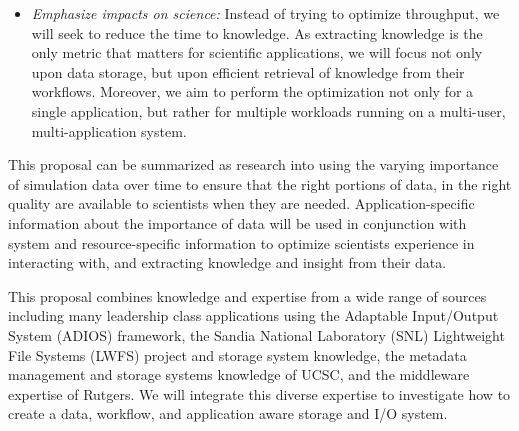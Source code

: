 \begin{itemize}
\item
{\em Emphasize impacts on science:}
Instead of trying to optimize throughput, we will seek to reduce the time to knowledge.
As extracting knowledge is the only metric that matters for scientific applications, we will
focus not only upon data storage, but upon efficient  retrieval of knowledge from their 
workflows.
Moreover, we aim to perform the optimization not only for a single
application, but rather for multiple workloads running on a multi-user, multi-application
system.
\end{itemize}

This proposal can be summarized as research into using the varying importance of simulation data over time to
ensure that the right portions of data, in the right quality  are available to scientists when they are needed.
Application-specific information about the importance of data will be used in conjunction with system and resource-specific information
to optimize  scientists experience in interacting with, and extracting knowledge and insight from their  data.


This proposal combines knowledge and expertise 
from a wide range of sources including many leadership class applications using the Adaptable Input/Output System (ADIOS) framework,
the Sandia National Laboratory (SNL) Lightweight File Systems (LWFS) project and storage system knowledge, the metadata
management and storage systems knowledge of UCSC, and the middleware expertise
of Rutgers. We will integrate this diverse expertise to investigate how to create
a data, workflow, and application aware storage and I/O system.

